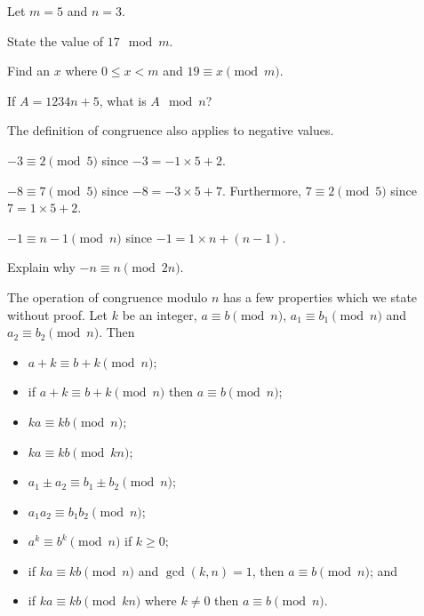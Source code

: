 \begin{exercise}
    Let $m = 5$ and $n = 3$.
    \begin{partquestions}{\alph*}
        \item State the value of $17 \mod m$.
        \item Find an $x$ where $0 \leq x < m$ and $19 \equiv x \pmod m$.
        \item If $A = 1234n + 5$, what is $A \mod n$?
    \end{partquestions}
\end{exercise}

The definition of congruence also applies to negative values.
\begin{example}
    $-3 \equiv 2 \pmod5$ since $-3 = -1\times5 + 2$.
\end{example}

\begin{example}
    $-8 \equiv 7 \pmod5$ since $-8 = -3\times5 + 7$. Furthermore, $7 \equiv 2 \pmod5$ since $7 = 1\times5 + 2$.
\end{example}

\begin{example}
    $-1 \equiv n-1 \pmod{n}$ since $-1 = 1\times n + (n-1)$.
\end{example}

\begin{exercise}
    Explain why $-n \equiv n \pmod{2n}$.
\end{exercise}

The operation of congruence modulo $n$ has a few properties which we state without proof. Let $k$ be an integer, $a \equiv b \pmod n$, $a_1 \equiv b_1 \pmod n$ and $a_2 \equiv b_2 \pmod n$. Then
\begin{itemize}
    \item $a + k \equiv b + k \pmod n$;
    \item if $a+k \equiv b+k \pmod n$ then $a \equiv b \pmod n$;
    \item $ka \equiv kb \pmod n$;
    \item $ka \equiv kb \pmod {kn}$;
    \item $a_1 \pm a_2 \equiv b_1 \pm b_2 \pmod n$;
    \item $a_1a_2 \equiv b_1b_2 \pmod n$;
    \item $a^k \equiv b^k \pmod n$ if $k \geq 0$;
    \item if $ka \equiv kb \pmod n$ and $\gcd(k, n) = 1$, then $a \equiv b \pmod n$; and
    \item if $ka \equiv kb \pmod{kn}$ where $k \neq 0$ then $a \equiv b \pmod n$.
\end{itemize}

